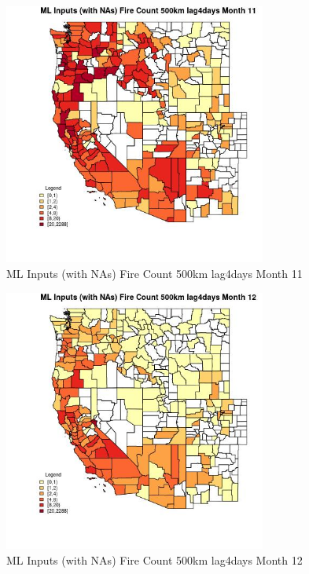 \begin{figure} 
\centering  
\includegraphics[width=0.77\textwidth]{Code_Outputs/Report_ML_input_PM25_Step4_part_e_de_duplicated_aves_compiled_2019-05-20wNAs_CountyFire_Count_500km_lag4daysmedianMonth11.jpg} 
\caption{\label{fig:Report_ML_input_PM25_Step4_part_e_de_duplicated_aves_compiled_2019-05-20wNAsCountyFire_Count_500km_lag4daysmedianMonth11}ML Inputs (with NAs) Fire Count 500km lag4days Month 11} 
\end{figure} 
 

\begin{figure} 
\centering  
\includegraphics[width=0.77\textwidth]{Code_Outputs/Report_ML_input_PM25_Step4_part_e_de_duplicated_aves_compiled_2019-05-20wNAs_CountyFire_Count_500km_lag4daysmedianMonth12.jpg} 
\caption{\label{fig:Report_ML_input_PM25_Step4_part_e_de_duplicated_aves_compiled_2019-05-20wNAsCountyFire_Count_500km_lag4daysmedianMonth12}ML Inputs (with NAs) Fire Count 500km lag4days Month 12} 
\end{figure} 
 


